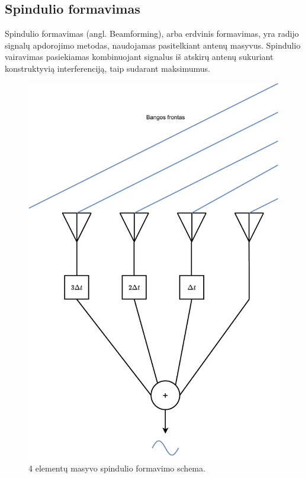 \documentclass[main.tex]{subfiles}
\begin{document}
\subsection{Spindulio formavimas}

Spindulio formavimas (angl. Beamforming), arba erdvinis formavimas, yra radijo signalų apdorojimo
metodas,
naudojamas pasitelkiant antenų masyvus. Spindulio vairavimas pasiekiamas kombinuojant
signalus iš atskirų antenų sukuriant konstruktyvią interferenciją, taip sudarant
maksimumus.

\begin{figure}[h]
    \begin{centering}
    \includegraphics[scale=0.5]{drawings/simple_steering}
    \par\end{centering}
    \protect\caption{\label{fig:simple_steering}4 elementų masyvo spindulio formavimo schema.}
\end{figure}
\end{document}
